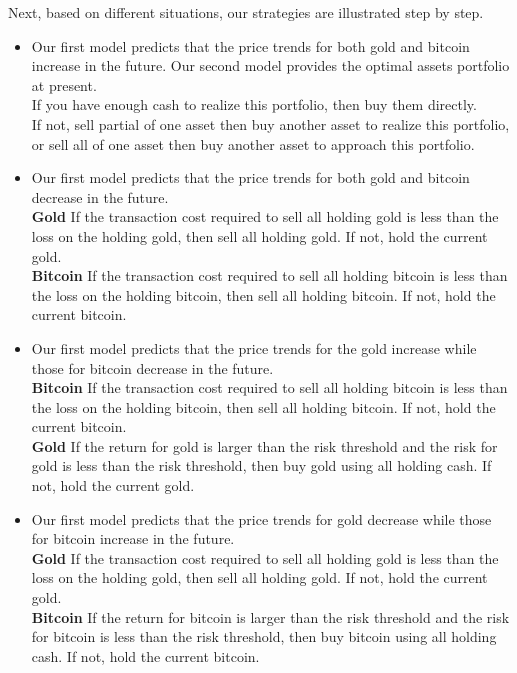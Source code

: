 \documentclass[12pt]{article}
\begin{document}
Next, based on different situations, our strategies are illustrated step by step.
\begin{itemize}
\item Our first model predicts that the price trends for both gold and bitcoin increase in the future. Our second model provides the optimal assets portfolio at present.\\
If you have enough cash to realize this portfolio, then buy them directly.\\
If not, sell partial of one asset then buy another asset to realize this portfolio, or sell all of one asset then buy another asset to approach this portfolio.
\item Our first model predicts that the price trends for both gold and bitcoin decrease in the future.\\
\textbf{Gold} If the transaction cost required to sell all holding gold is less than the loss on the holding gold, then sell all holding gold. If not, hold the current gold.\\
\textbf{Bitcoin} If the transaction cost required to sell all holding bitcoin is less than the loss on the holding bitcoin, then sell all holding bitcoin. If not, hold the current bitcoin.
\item Our first model predicts that the price trends for the gold increase while those for bitcoin decrease in the future.\\
\textbf{Bitcoin} If the transaction cost required to sell all holding bitcoin is less than the loss on the holding bitcoin, then sell all holding bitcoin. If not, hold the current bitcoin.\\
\textbf{Gold} If the return for gold is larger than the risk threshold and the risk for gold is less than the risk threshold, then buy gold using all holding cash. If not, hold the current gold.
\item Our first model predicts that the price trends for gold decrease while those for bitcoin increase in the future.\\
\textbf{Gold} If the transaction cost required to sell all holding gold is less than the loss on the holding gold, then sell all holding gold. If not, hold the current gold.\\
\textbf{Bitcoin} If the return for bitcoin is larger than the risk threshold and the risk for bitcoin is less than the risk threshold, then buy bitcoin using all holding cash. If not, hold the current bitcoin.
\end{itemize}
\end{document}
